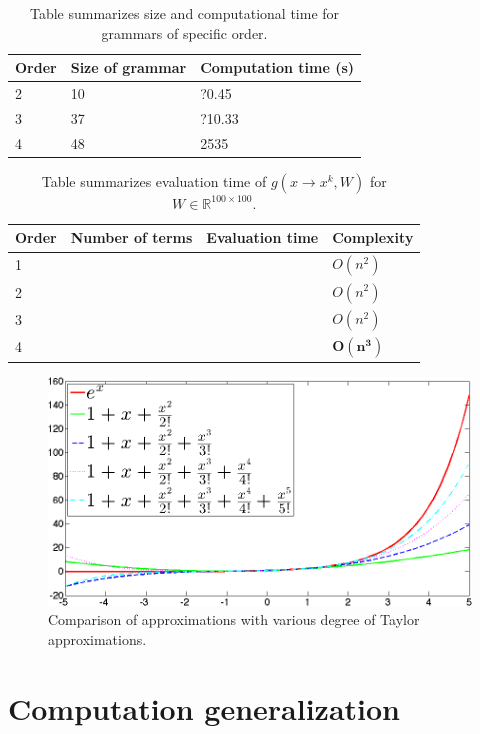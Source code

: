 \documentclass{article}
\begin{document}
\begin{table}
\tiny
\centering
\begin{tabular}{|l||l|l|}
\hline
Order & Size of grammar & Computation time (s) \\
\hline\hline
2 & 10 & ?0.45 \\
3 & 37 & ?10.33 \\
4 & 48 & 2535\\
\hline
\end{tabular}
\caption{Table summarizes size and computational time for grammars of specific order.}
\label{grammars}
\end{table}

\begin{table}
\tiny
\centering
\begin{tabular}{|l||l|l|l|}
\hline
Order & Number of terms & Evaluation time & Complexity \\
\hline\hline
1 & & & $O(n^2)$\\
2 & & & $O(n^2)$\\
3 & & & $O(n^2)$\\
4 & & & $\mathbf{O(n^3)}$\\
\hline
\end{tabular}
\caption{Table summarizes evaluation time of $g(x \rightarrow x^k, W)$ for $W \in \mathbb{R}^{100 \times 100}$.}
\label{grammars}
\end{table}

\begin{figure}[h]
\centering
\includegraphics[scale=0.2]{img/approximations.png}
\caption{Comparison of approximations with various degree of Taylor approximations.}
\label{approximations}
\end{figure}


\section{Computation generalization}\label{agenda}
\end{document}
